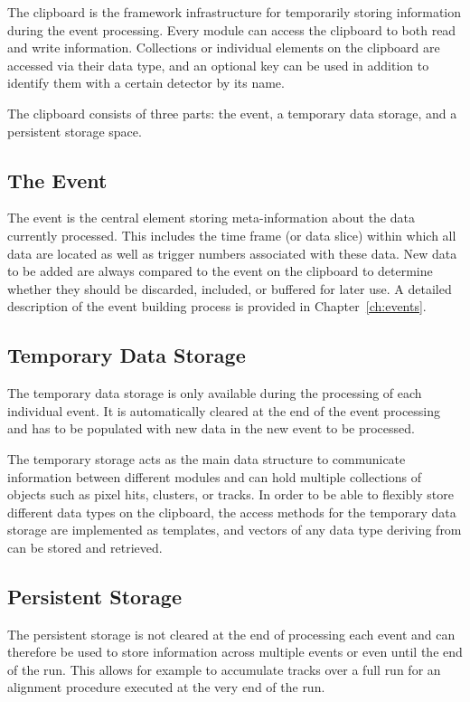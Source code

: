 The clipboard is the framework infrastructure for temporarily storing information during the event processing.
Every module can access the clipboard to both read and write information.
Collections or individual elements on the clipboard are accessed via their data type, and an optional key can be used in addition to identify them with a certain detector by its name.

The clipboard consists of three parts: the event, a temporary data storage, and a persistent storage space.

\subsection{The Event}

The event is the central element storing meta-information about the data currently processed.
This includes the time frame (or data slice) within which all data are located as well as trigger numbers associated with these data.
New data to be added are always compared to the event on the clipboard to determine whether they should be discarded, included, or buffered for later use.
A detailed description of the event building process is provided in Chapter~\ref{ch:events}.

\subsection{Temporary Data Storage}
The temporary data storage is only available during the processing of each individual event.
It is automatically cleared at the end of the event processing and has to be populated with new data in the new event to be processed.

The temporary storage acts as the main data structure to communicate information between different modules and can hold multiple collections of \corry objects such as pixel hits, clusters, or tracks.
In order to be able to flexibly store different data types on the clipboard, the access methods for the temporary data storage are implemented as templates, and vectors of any data type deriving from  can be stored and retrieved.

\subsection{Persistent Storage}
The persistent storage is not cleared at the end of processing each event and can therefore be used to store information across multiple events or even until the end of the run.
This allows for example to accumulate tracks over a full run for an alignment procedure executed at the very end of the run.


